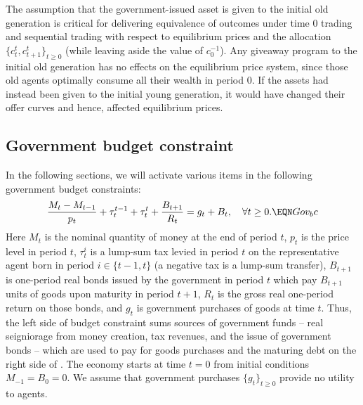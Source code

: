 The assumption that the government-issued asset 
is given to the initial old generation 
is critical for delivering  equivalence of 
outcomes under time $0$ trading and sequential 
trading with respect to equilibrium prices and
the allocation $\{c^t_t, c^t_{t+1}\}_{t\geq0}$
(while leaving aside the value of $c^{-1}_0$).
Any giveaway program to the 
initial old generation has no effects on the 
equilibrium price system, since 
those old agents optimally consume all their
wealth in period $0$. If the assets had
instead been given to the initial young generation,
it would have changed their offer curves and hence, 
affected equilibrium prices.




\subsection{Government budget constraint}
In the following sections, we will activate various items
in the following government budget constraints: 
$$ {M_t - M_{t-1} \over  p_t} + \tau^{t-1}_t + \tau^t_t 
+ {B_{t+1} \over R_t} = g_t + B_t,  \quad \forall t \geq 0. \EQN Gov_bc $$
Here  $M_t$ is the nominal quantity of money at the end of period $t$,
$p_t$ is the price level in period $t$, $\tau^i_t$ is a lump-sum
tax levied in period $t$ on the representative agent born in 
period $i\in\{t-1, t\}$ (a negative tax is a lump-sum transfer), 
$B_{t+1}$ is
one-period real bonds issued by the government in period $t$ which
pay $B_{t+1}$ units of goods upon maturity in period $t+1$, $R_t$
is the gross real one-period return on those bonds, and
$g_t$ is government purchases of goods at time $t$. Thus,
the left side of budget constraint  sums sources of  
government funds -- real seigniorage from money creation,
tax revenues, and the issue of government bonds -- which are
used to pay for goods purchases and the maturing debt on
the right side of . The economy starts
at time $t=0$ from  initial conditions 
$M_{-1}= B_0 = 0$. We assume that government purchases
$\{g_t\}_{t \geq 0}$ provide no utility to agents.



